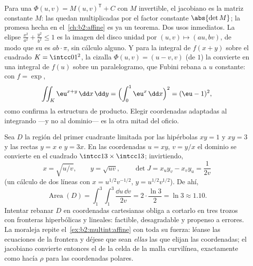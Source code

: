 \begin{example}\label{ex:b2:multint:affine}
Para una  $\Phi(u, v) = M(u, v)^{\mathsf T} + C$ con
$M$ invertible, el jacobiano es la matriz constante $M$: las 
quedan multiplicadas por el factor constante $\abs{\det M}$; la
promesa hecha en el~\cref{ch:b2:affine} es ya un teorema. Dos usos
inmediatos. La elipse $\frac{x^2}{a^2} + \frac{y^2}{b^2} \leq 1$ es
la imagen del disco unidad por $(u, v) \mapsto (au, bv)$, de modo que
su  es $ab \cdot \pi$, sin cálculo alguno. Y para la integral de
$f(x + y)$ sobre el cuadrado $K = \intcc01^2$, la cizalla $\Phi(u, v)
= (u - v, v)$ (de  $1$) la convierte en una integral de
$f(u)$ sobre un paralelogramo, que Fubini rebana a $u$ constante: con
$f = \exp$,
\[
\iint_K \eu^{x+y}\,\dd x\,\dd y
= \Bigl(\int_0^1 \eu^x\,\dd x\Bigr)^2 = (\eu - 1)^2,
\]
como confirma la estructura de producto. Elegir coordenadas adaptadas
al integrando ---y no al dominio--- es la otra mitad del oficio.
\end{example}


\begin{example}\label{ex:b2:multint:hyperbolicregion}
Sea $D$ la región del primer cuadrante limitada por las hipérbolas
$xy = 1$ y $xy = 3$ y las rectas $y = x$ e $y = 3x$. En las
coordenadas $u = xy$, $v = y/x$ el dominio se convierte en el
cuadrado $\intcc13 \times \intcc13$; invirtiendo,
\[
x = \sqrt{u/v}, \qquad y = \sqrt{uv},
\qquad
\det J = x_uy_v - x_vy_u = \frac{1}{2v}
\]
(un cálculo de dos líneas con $x = u^{1/2}v^{-1/2}$, $y =
u^{1/2}v^{1/2}$). De ahí,
\[
\operatorname{Area}(D)
= \int_1^3\!\!\int_1^3\frac{\dd u\,\dd v}{2v}
= 2\cdot\frac{\ln 3}{2} = \ln 3 \approx 1.10 .
\]
Intentar rebanar $D$ en coordenadas cartesianas obliga a cortarlo en
tres trozos con fronteras hiperbólicas y lineales: factible,
desagradable y propenso a errores. La moraleja repite el~\cref{ex:b2:multint:affine} con toda su fuerza: léanse las ecuaciones
de la frontera y déjese que sean \emph{ellas} las que elijan las
coordenadas; el jacobiano convierte entonces el  de la celda de
la malla curvilínea, exactamente como hacía $\rho$ para las
coordenadas polares.
\end{example}

